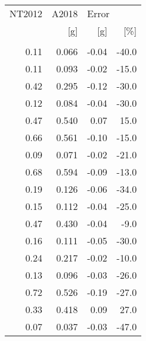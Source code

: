 \begin{tabular}{rrrr}
\toprule
NT2012 &  A2018 & \multicolumn{2}{l}{Error} \\
   [g] &    [g] &   [g] &   [\%] \\
       &        &       &       \\
\midrule
  0.11 &  0.066 & -0.04 & -40.0 \\
  0.11 &  0.093 & -0.02 & -15.0 \\
  0.42 &  0.295 & -0.12 & -30.0 \\
  0.12 &  0.084 & -0.04 & -30.0 \\
  0.47 &  0.540 &  0.07 &  15.0 \\
  0.66 &  0.561 & -0.10 & -15.0 \\
  0.09 &  0.071 & -0.02 & -21.0 \\
  0.68 &  0.594 & -0.09 & -13.0 \\
  0.19 &  0.126 & -0.06 & -34.0 \\
  0.15 &  0.112 & -0.04 & -25.0 \\
  0.47 &  0.430 & -0.04 &  -9.0 \\
  0.16 &  0.111 & -0.05 & -30.0 \\
  0.24 &  0.217 & -0.02 & -10.0 \\
  0.13 &  0.096 & -0.03 & -26.0 \\
  0.72 &  0.526 & -0.19 & -27.0 \\
  0.33 &  0.418 &  0.09 &  27.0 \\
  0.07 &  0.037 & -0.03 & -47.0 \\
\bottomrule
\end{tabular}
